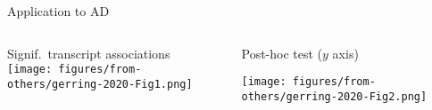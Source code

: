 \documentclass{beamer}
\begin{document}
\begin{frame}{Application to AD}
\begin{columns}[t]
\begin{column}{0.5\textwidth}
Signif.~transcript associations\\

\texttt{[image: figures/from-others/gerring-2020-Fig1.png]}
\end{column}

\begin{column}{0.5\textwidth}
Post-hoc test ($y$ axis)

\texttt{[image: figures/from-others/gerring-2020-Fig2.png]}
\end{column}
\end{columns}
\end{frame}
\end{document}

